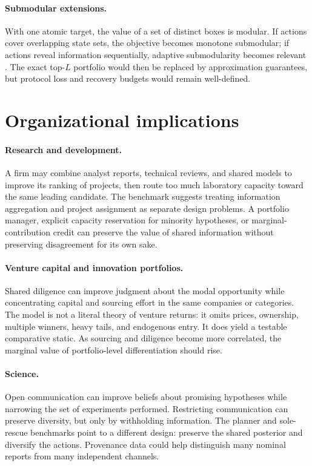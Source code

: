 \documentclass[11pt]{article}
\theoremstyle{definition}
\theoremstyle{remark}
\newcommand{\1}{\mathbf{1}}
\begin{document}
\paragraph{Submodular extensions.}
With one atomic target, the value of a set of distinct boxes is modular. If actions cover overlapping state sets, the objective becomes monotone submodular; if actions reveal information sequentially, adaptive submodularity becomes relevant \citep{NemhauserEtAl1978,GolovinKrause2011}. The exact top-$L$ portfolio would then be replaced by approximation guarantees, but protocol loss and recovery budgets would remain well-defined.

\section{Organizational implications}
\label{sec:implications}

\paragraph{Research and development.}
A firm may combine analyst reports, technical reviews, and shared models to improve its ranking of projects, then route too much laboratory capacity toward the same leading candidate. The benchmark suggests treating information aggregation and project assignment as separate design problems. A portfolio manager, explicit capacity reservation for minority hypotheses, or marginal-contribution credit can preserve the value of shared information without preserving disagreement for its own sake.

\paragraph{Venture capital and innovation portfolios.}
Shared diligence can improve judgment about the modal opportunity while concentrating capital and sourcing effort in the same companies or categories. The model is not a literal theory of venture returns: it omits prices, ownership, multiple winners, heavy tails, and endogenous entry. It does yield a testable comparative static. As sourcing and diligence become more correlated, the marginal value of portfolio-level differentiation should rise.

\paragraph{Science.}
Open communication can improve beliefs about promising hypotheses while narrowing the set of experiments performed. Restricting communication can preserve diversity, but only by withholding information. The planner and sole-rescue benchmarks point to a different design: preserve the shared posterior and diversify the actions. Provenance data could help distinguish many nominal reports from many independent channels.
\end{document}

